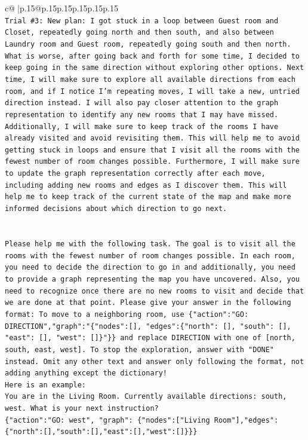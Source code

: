 \documentclass{article}
\begin{document}
{\begin{supertabular}{c@{$\;$}|p{.15\linewidth}@{}p{.15\linewidth}p{.15\linewidth}p{.15\linewidth}p{.15\linewidth}p{.15\linewidth}}
{{{\\ 
\texttt{Trial \#3: New plan: I got stuck in a loop between Guest room and Closet, repeatedly going north and then south, and also between Laundry room and Guest room, repeatedly going south and then north. What is worse, after going back and forth for some time, I decided to keep going in the same direction without exploring other options. Next time, I will make sure to explore all available directions from each room, and if I notice I'm repeating moves, I will take a new, untried direction instead. I will also pay closer attention to the graph representation to identify any new rooms that I may have missed. Additionally, I will make sure to keep track of the rooms I have already visited and avoid revisiting them. This will help me to avoid getting stuck in loops and ensure that I visit all the rooms with the fewest number of room changes possible. Furthermore, I will make sure to update the graph representation correctly after each move, including adding new rooms and edges as I discover them. This will help me to keep track of the current state of the map and make more informed decisions about which direction to go next.} \\
\\ 
\\ 
\texttt{Please help me with the following task. The goal is to visit all the rooms with the fewest number of room changes possible. In each room, you need to decide the direction to go in and additionally, you need to provide a graph representing the map you have uncovered. Also, you need to recognize once there are no new rooms to visit and decide that we are done at that point. Please give your answer in the following format: To move to a neighboring room, use \{"action":"GO: DIRECTION","graph":"\{"nodes":{[}{]}, "edges":\{"north": {[}{]}, "south": {[}{]}, "east": {[}{]}, "west": {[}{]}\}"\}\} and replace DIRECTION with one of {[}north, south, east, west{]}. To stop the exploration, answer with "DONE" instead. Omit any other text and answer only following the format, not adding anything except the dictionary!} \\
\texttt{Here is an example: } \\
\texttt{You are in the Living Room. Currently available directions: south, west. What is your next instruction?} \\
\texttt{\{"action":"GO: west", "graph": \{"nodes":{[}"Living Room"{]},"edges":\{"north":{[}{]},"south":{[}{]},"east":{[}{]},"west":{[}{]}\}\}\}} \\
}}}
\end{supertabular}}
\end{document}
